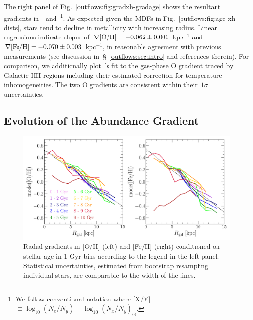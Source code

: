 The right panel of Fig.~\ref{outflows:fig:gradxh-gradage} shows the resultant
gradients in~\oh~and~\feh\footnote{
	We follow conventional notation where
	[X/Y]~$\equiv \log_{10} (N_x / N_y) - \log_{10} (N_x / N_y)_\odot$.
}.
As expected given the MDFs in Fig.~\ref{outflows:fig:age-xh-dists}, stars tend
to decline in metallicity with increasing radius.
Linear regressions indicate slopes of~$\nabla\text{[O/H]} = -0.062 \pm 0.001$ kpc$^{-1}$
and~$\nabla\text{[Fe/H]} = -0.070 \pm 0.003$ kpc$^{-1}$, in reasonable agreement with
previous measurements (see discussion in~\S~\ref{outflows:sec:intro} and
references therein).
For comparison, we additionally plot~\citeauthor{MendezDelgado2022}'s
\citeyearpar{MendezDelgado2022} fit to the gas-phase O gradient traced by
Galactic HII regions including their estimated correction for temperature
inhomogeneities.
The two O gradients are consistent within their~$1\sigma$ uncertainties.

\subsection{Evolution of the Abundance Gradient}
\label{outflows:sec:empirical:evolution}

\begin{figure}
\centering
\includegraphics[scale = 0.55]{gradxh_fixedage.pdf}
\caption{
Radial gradients in [O/H] (left) and [Fe/H] (right) conditioned on stellar age
in 1-Gyr bins according to the legend in the left panel.
Statistical uncertainties, estimated from bootstrap resampling individual stars,
are comparable to the width of the lines.
}
\label{outflows:fig:gradxh-fixed-age}
\end{figure}


